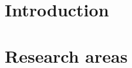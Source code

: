 \documentclass[ twoside,openright,titlepage,numbers=noenddot,%
                headinclude,footinclude,cleardoublepage=empty,abstract=on,
                BCOR=5mm,paper=a4,fontsize=10pt,
                ]{scrreprt}
\begin{document}
\frenchspacing
\raggedbottom
{} %
\pagestyle{plain}
% 
% 
% 
\cleardoublepage
\cleardoublepage
\pagestyle{scrheadings}
\cleardoublepage




\part{Introduction}\label{part:introduction}
\cleardoublepage
\cleardoublepage

\part{Research areas}\label{part:research}

\end{document}
